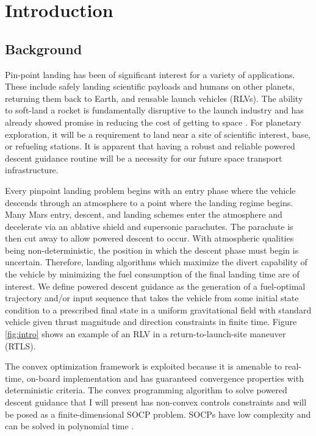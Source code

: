 \chapter{Introduction}
\label{introchap}

\section{Background}
Pin-point landing has been of significant interest for a variety of applications. These include safely landing scientific payloads and humans on other planets, returning them back to Earth, and reusable launch vehicles (RLVs). The ability to soft-land a rocket is fundamentally disruptive to the launch industry and has already showed promise in reducing the cost of getting to space \cite{jones2018recent}. For planetary exploration, it will be a requirement to land near a site of scientific interest, base, or refueling stations. It is apparent that having a robust and reliable powered descent guidance routine will be a necessity for our future space transport infrastructure.

Every pinpoint landing problem begins with an entry phase where the vehicle descends through an atmosphere to a point where the landing regime begins. Many Mars entry, descent, and landing schemes enter the atmosphere and decelerate via an ablative shield and supersonic parachutes. The parachute is then cut away to allow powered descent to occur. With atmospheric qualities being non-deterministic, the position in which the descent phase must begin is uncertain. Therefore, landing algorithms which maximize the divert capability of the vehicle by minimizing the fuel consumption of the final landing time are of interest. We define powered descent guidance as the generation of a fuel-optimal trajectory and/or input sequence that takes the vehicle from some initial state condition to a prescribed final state in a uniform gravitational field with standard vehicle given thrust magnitude and direction constraints in finite time. Figure \ref{fig:intro} shows an example of an RLV in a return-to-launch-site maneuver (RTLS).

The convex optimization framework is exploited because it is amenable to real-time, on-board implementation and has guaranteed convergence properties with deterministic criteria. The convex programming algorithm to solve powered descent guidance that I will present has non-convex controls constraints and will be posed as a finite-dimensional SOCP problem. SOCPs have low complexity and can be solved in polynomial time \cite{boyd2004convex}.

